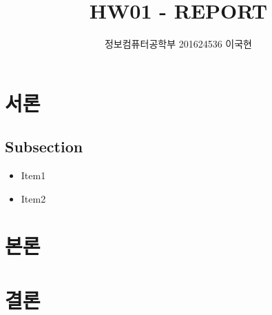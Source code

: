 \documentclass[]{report}
\title{HW01 - REPORT}
\author{정보컴퓨터공학부 201624536 이국현}
\begin{document}
\maketitle


\section{서론}
\subsection{Subsection}
\begin{itemize}
	\item Item1
	\item Item2
\end{itemize}

\section{본론}


\section{결론}
\end{document}
